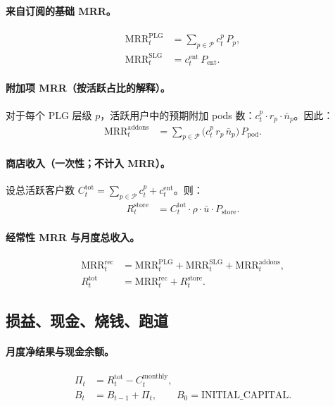 \documentclass[11pt, a4paper, oneside]{article}
\begin{document}
\paragraph{来自订阅的基础 MRR。}
\begin{align}
\mathrm{MRR}^{\mathrm{PLG}}_t &= \sum_{p \in \mathcal{P}} c^p_t \, P_p,\\
\mathrm{MRR}^{\mathrm{SLG}}_t &= c^{\mathrm{ent}}_t \, P_{\mathrm{ent}}.
\end{align}

\paragraph{附加项 MRR（按活跃占比的解释）。}
对于每个 PLG 层级 $p$，活跃用户中的预期附加 pods 数：$c^p_t \cdot r_p \cdot \bar{n}_p$。因此：
\begin{align}
\mathrm{MRR}^{\mathrm{addons}}_t 
  &= \sum_{p \in \mathcal{P}} \bigl(c^p_t \, r_p \, \bar{n}_p\bigr)\, P_{\mathrm{pod}}.
\end{align}

\paragraph{商店收入（一次性；不计入 MRR）。}
设总活跃客户数 $C^{\mathrm{tot}}_t = \sum_{p \in \mathcal{P}} c^p_t + c^{\mathrm{ent}}_t$。则：
\begin{align}
R^{\mathrm{store}}_t 
  &= C^{\mathrm{tot}}_t \cdot \rho \cdot \bar{u} \cdot P_{\mathrm{store}}.
\end{align}

\paragraph{经常性 MRR 与月度总收入。}
\begin{align}
\mathrm{MRR}^{\mathrm{rec}}_t 
  &= \mathrm{MRR}^{\mathrm{PLG}}_t + \mathrm{MRR}^{\mathrm{SLG}}_t + \mathrm{MRR}^{\mathrm{addons}}_t,\\
R^{\mathrm{tot}}_t 
  &= \mathrm{MRR}^{\mathrm{rec}}_t + R^{\mathrm{store}}_t.
\end{align}

\subsection{损益、现金、烧钱、跑道}
\paragraph{月度净结果与现金余额。}
\begin{align}
\Pi_t &= R^{\mathrm{tot}}_t - C^{\mathrm{monthly}}_t,\\
B_t &= B_{t-1} + \Pi_t, \qquad B_0 = \text{INITIAL\_CAPITAL}.
\end{align}
\end{document}
